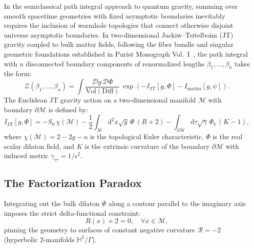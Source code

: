 \documentclass[11pt,a4paper,reqno]{article}
\theoremstyle{plain}
\theoremstyle{definition}
\theoremstyle{remark}
\numberwithin{equation}{section}
\newcommand{\diff}{\mathrm{d}}
\begin{document}
In the semiclassical path integral approach to quantum gravity, summing over smooth spacetime geometries with fixed asymptotic boundaries inevitably requires the inclusion of wormhole topologies that connect otherwise disjoint universe asymptotic boundaries. In two-dimensional Jackiw--Teitelboim (JT) gravity coupled to bulk matter fields, following the fiber bundle and singular geometric foundations established in Purist Monograph Vol.~I~\cite{PuristVol1Monograph2026}, the path integral with $n$ disconnected boundary components of renormalized lengths $\beta_1, \dots, \beta_n$ takes the form:
\begin{equation}
  \mathcal{Z}(\beta_1, \dots, \beta_n) = \int \frac{\mathcal{D}g\,\mathcal{D}\Phi}{\mathrm{Vol}(\mathrm{Diff})} \, \exp\left( - I_{\mathrm{JT}}[g, \Phi] - I_{\mathrm{matter}}[g, \psi] \right).
  \label{eq:gravitational_path_integral}
\end{equation}
The Euclidean JT gravity action on a two-dimensional manifold $\mathcal{M}$ with boundary $\partial\mathcal{M}$ is defined by:
\begin{equation}
  I_{\mathrm{JT}}[g, \Phi] = - S_0 \, \chi(\mathcal{M}) - \frac{1}{2} \int_{\mathcal{M}} \diff^2 x \sqrt{g} \, \Phi \, (R + 2) - \int_{\partial\mathcal{M}} \diff \tau \sqrt{\gamma} \, \Phi_b \, (K - 1),
  \label{eq:jt_action}
\end{equation}
where $\chi(\mathcal{M}) = 2 - 2g - n$ is the topological Euler characteristic, $\Phi$ is the real scalar dilaton field, and $K$ is the extrinsic curvature of the boundary $\partial\mathcal{M}$ with induced metric $\gamma_{\tau\tau} = 1/\epsilon^2$.

\subsection{The Factorization Paradox}
Integrating out the bulk dilaton $\Phi$ along a contour parallel to the imaginary axis imposes the strict delta-functional constraint:
\begin{equation}
  R(x) + 2 = 0, \quad \forall x \in \mathcal{M},
\end{equation}
pinning the geometry to surfaces of constant negative curvature $\mathcal{R} = -2$ (hyperbolic 2-manifolds $\mathbb{H}^2 / \Gamma$).
\end{document}
